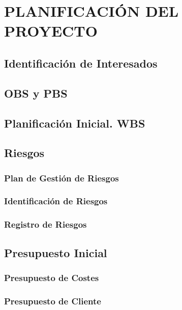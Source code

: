 \section{PLANIFICACIÓN DEL PROYECTO}

\subsection{Identificación de Interesados}


\subsection{OBS y PBS}


\subsection{Planificación Inicial. WBS}


\subsection{Riesgos}

\subsubsection{Plan de Gestión de Riesgos} 

\subsubsection{Identificación de Riesgos}

\subsubsection{Registro de Riesgos} 



\subsection{Presupuesto Inicial}

\subsubsection{Presupuesto de Costes}

\subsubsection{Presupuesto de Cliente} 


